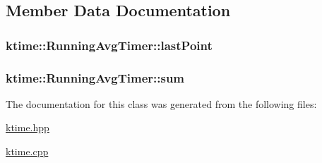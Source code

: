 \subsection{Member Data Documentation}
\hypertarget{classktime_1_1_running_avg_timer_aebd941b0d88a2ea2a5b9fe48b6466f56}{
\subsubsection[{last\-Point}]{ {\bf ktime\-::\-Running\-Avg\-Timer\-::last\-Point}}}\label{classktime_1_1_running_avg_timer_aebd941b0d88a2ea2a5b9fe48b6466f56}
\hypertarget{classktime_1_1_running_avg_timer_a6a22c54aaa6acb0a414f1c276a31ee1c}{
\subsubsection[{sum}]{ {\bf ktime\-::\-Running\-Avg\-Timer\-::sum}}}\label{classktime_1_1_running_avg_timer_a6a22c54aaa6acb0a414f1c276a31ee1c}


The documentation for this class was generated from the following files\-:\begin{DoxyCompactItemize}
\item 
\hyperlink{ktime_8hpp}{ktime.\-hpp}\item 
\hyperlink{ktime_8cpp}{ktime.\-cpp}\end{DoxyCompactItemize}
